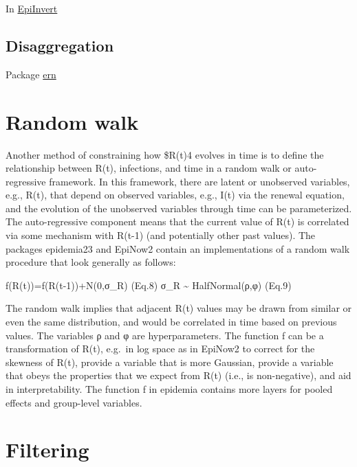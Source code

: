 \documentclass[
  letterpaper,
  DIV=11,
  numbers=noendperiod]{scrreprt}
\begin{document}
In \href{package_EpiInvert.qmd}{EpiInvert}

\subsection*{Disaggregation}\label{sec-disagg}

Package \href{package_ern.qmd}{ern}

\section*{Random walk}\label{sec-randomwalk}


Another method of constraining how \$R(t)4 evolves in time is to define
the relationship between R(t), infections, and time in a random walk or
auto-regressive framework. In this framework, there are latent or
unobserved variables, e.g., R(t), that depend on observed variables,
e.g., I(t) via the renewal equation, and the evolution of the unobserved
variables through time can be parameterized. The auto-regressive
component means that the current value of R(t) is correlated via some
mechanism with R(t-1) (and potentially other past values). The packages
epidemia23 and EpiNow2 contain an implementations of a random walk
procedure that look generally as follows:

f(R(t))=f(R(t-1))+N(0,σ\_R) (Eq.8) σ\_R \textasciitilde{}
HalfNormal(ρ,φ) (Eq.9)

The random walk implies that adjacent R(t) values may be drawn from
similar or even the same distribution, and would be correlated in time
based on previous values. The variables ρ and φ are hyperparameters. The
function f can be a transformation of R(t), e.g.~in log space as in
EpiNow2 to correct for the skewness of R(t), provide a variable that is
more Gaussian, provide a variable that obeys the properties that we
expect from R(t) (i.e., is non-negative), and aid in interpretability.
The function f in epidemia contains more layers for pooled effects and
group-level variables.

\section*{Filtering}\label{sec-filtering}

\end{document}
